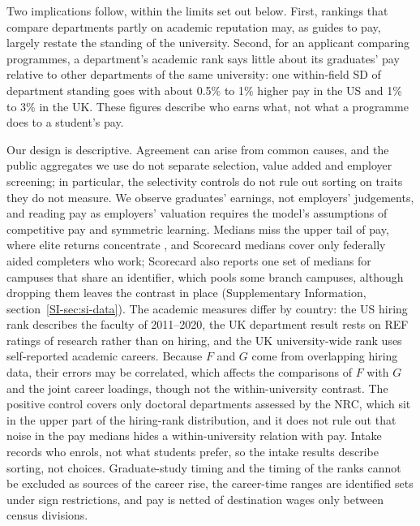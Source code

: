 \documentclass[11pt]{article}
\newcommand{\SIsec}[1]{Supplementary Information, section~\ref{SI-#1}}
\begin{document}
Two implications follow, within the limits set out below. First, rankings that compare departments partly on academic
reputation \citep{qs_subject} may, as guides to pay, largely restate the standing of the university. Second, for an
applicant comparing programmes, a department's academic rank says little about its graduates' pay relative to other
departments of the same university: one within-field SD of department standing goes with about 0.5\% to 1\% higher
pay in the US and 1\% to 3\% in the UK. These figures describe who earns what, not what a programme does to a student's
pay.

Our design is descriptive. Agreement can arise from common causes, and the public aggregates
we use do not separate selection, value added and employer screening; in particular, the selectivity controls do not
rule out sorting on traits they do not measure. We observe graduates' earnings, not employers' judgements, and reading
pay as employers' valuation requires the model's assumptions of competitive pay and symmetric learning. Medians miss
the upper tail of pay, where elite returns concentrate \citep{zimmerman2019elite, chetty2023diversifying}, and
Scorecard medians cover only federally aided completers who work; Scorecard also reports one set of medians for
campuses that share an identifier, which pools some branch campuses, although dropping them leaves the contrast in
place (\SIsec{sec:si-data}). The academic measures differ by country: the US hiring rank describes the faculty of
2011--2020, the UK department result rests on REF ratings of research rather than on hiring, and the UK
university-wide rank uses self-reported academic careers. Because $F$ and $G$ come from overlapping hiring data, their
errors may be correlated, which affects the comparisons of $F$ with $G$ and the joint career loadings, though not the
within-university contrast. The positive control covers only doctoral departments assessed by the NRC, which sit in
the upper part of the hiring-rank distribution, and it does not rule out that noise in the pay medians hides a
within-university relation with pay. Intake records who enrols, not what students prefer, so the intake results describe
sorting, not choices. Graduate-study timing and the timing of the ranks cannot be excluded as sources of the career
rise, the career-time ranges are identified sets under sign restrictions, and pay is netted of destination wages only
between census divisions.
\end{document}
